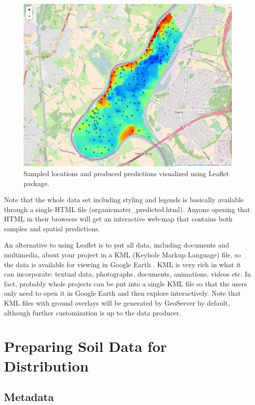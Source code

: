 \documentclass[10pt,b5paper,]{book}
\theoremstyle{definition}
\theoremstyle{definition}
\theoremstyle{definition}
\theoremstyle{remark}
\begin{document}
\begin{figure}
\centering
\includegraphics{images/Data_sharing_Leaflet.png}
\caption{Sampled locations and produced predictions visualized using
Leaflet package.}
\end{figure}

Note that the whole data set including styling and legends is basically
available through a single HTML file (organicmater\_predicted.html).
Anyone opening that HTML in their browsers will get an interactive
web-map that contains both samples and spatial predictions.

An alternative to using Leaflet is to put all data, including documents
and multimedia, about your project in a KML (Keyhole Markup Language)
file, so the data is available for viewing in Google Earth
\citep{hengl2015plotkml}. KML is very rich in what it can incorporate:
textual data, photographs, documents, animations, videos etc. In fact,
probably whole projects can be put into a single KML file so that the
users only need to open it in Google Earth and then explore
interactively. Note that KML files with ground overlays will be
generated by GeoServer by default, although further customization is up
to the data producer.

\hypertarget{preparing-soil-data-for-distribution}{%
\section{Preparing Soil Data for
Distribution}\label{preparing-soil-data-for-distribution}}

\hypertarget{metadata}{%
\subsection{Metadata}\label{metadata}}
\end{document}
